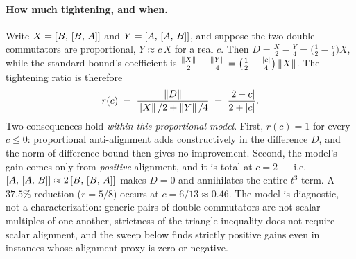 \paragraph{How much tightening, and when.}
Write $X = [B,\,[B,\,A]]$ and $Y = [A,\,[A,\,B]]$, and suppose the
two double commutators are proportional, $Y \approx c\,X$ for a real $c$. Then
$D = \tfrac{X}{2} - \tfrac{Y}{4} = \bigl(\tfrac12 - \tfrac{c}{4}\bigr) X$, while the
standard bound's coefficient is $\tfrac{\left\|X\right\|}{2} + \tfrac{\left\|Y\right\|}{4}
= \bigl(\tfrac12 + \tfrac{\left|c\right|}{4}\bigr)\left\|X\right\|$. The tightening ratio is therefore
\begin{equation}\label{eq:tighten-ratio}
  r(c) \;=\;
  \frac{\left\|D\right\|}{\left\|X\right\|/2 + \left\|Y\right\|/4}
  \;=\;
  \frac{\left|2 - c\right|}{2 + \left|c\right|} .
\end{equation}
Two consequences hold \emph{within this proportional model}. First,
$r(c) = 1$ for every $c \le 0$: proportional anti-alignment adds
constructively in the difference $D$, and the norm-of-difference bound then
gives no improvement. Second, the model's gain comes only from
\emph{positive} alignment, and it is total at $c = 2$ ---
i.e.\ $[A,\,[A,\,B]] \approx 2\,[B,\,[B,\,A]]$ makes $D = 0$ and
annihilates the entire $t^3$ term. A $37.5\%$ reduction ($r = 5/8$) occurs at
$c = 6/13 \approx 0.46$. The model is diagnostic, not a characterization:
generic pairs of double commutators are not scalar multiples of one another,
strictness of the triangle inequality does not require scalar alignment, and
the sweep below finds strictly positive gains even in instances whose
alignment proxy is zero or negative.

